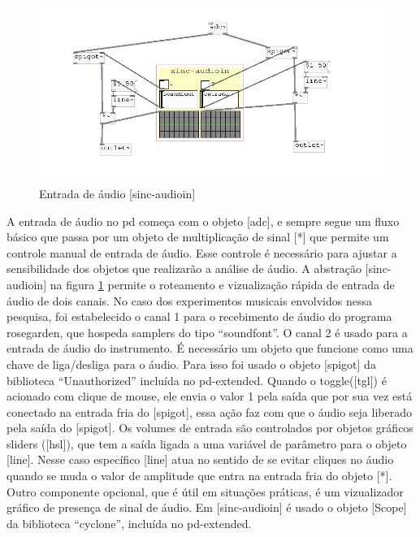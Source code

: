 \documentclass{ppgmus}
\begin{document}
\begin{figure}
\includegraphics[scale=.55]{audioin}
\caption{Entrada de áudio [sinc-audioin]}
\label{audioin}
\end{figure}

A entrada de áudio no pd começa com o objeto  [adc\texttildelow], e sempre segue um fluxo
básico que passa por um objeto de multiplicação de sinal [*\texttildelow] que permite um
controle manual de entrada de áudio. Esse controle é necessário para ajustar 
a sensibilidade dos objetos que realizarão a análise de áudio. A abstração 
[sinc-audioin] na figura \ref{audioin} permite o roteamento e vizualização rápida 
de entrada de áudio de dois canais. No caso dos experimentos musicais envolvidos 
nessa pesquisa, foi estabelecido o canal 1 para o recebimento de áudio do programa 
rosegarden, que hospeda samplers do tipo ``soundfont''. O canal 2 é usado para 
a entrada de áudio do instrumento. É necessário um objeto que funcione como uma chave de
liga/desliga para o áudio. Para isso foi usado o objeto [spigot\texttildelow] da biblioteca
``Unauthorized'' incluída no pd-extended.
 Quando o toggle([tgl]) é acionado com clique de mouse,
ele envia o valor 1 pela saída que por sua vez está conectado na entrada fria do
[spigot\texttildelow], essa ação faz com que o áudio seja liberado pela saída do [spigot\texttildelow].
Os volumes de entrada são controlados por objetos gráficos sliders ([hsl]), que tem
a saída ligada a uma variável de parâmetro para o objeto [line\texttildelow]. Nesse caso específico
[line\texttildelow] atua no sentido de se evitar cliques no áudio quando se muda o valor de 
amplitude que entra na entrada fria do objeto [*\texttildelow]. Outro componente
opcional, que é útil em situações práticas, é um vizualizador gráfico de presença de sinal
de áudio. Em [sinc-audioin] é usado o objeto [Scope\texttildelow] da biblioteca ``cyclone'', 
incluída no pd-extended.
\end{document}
